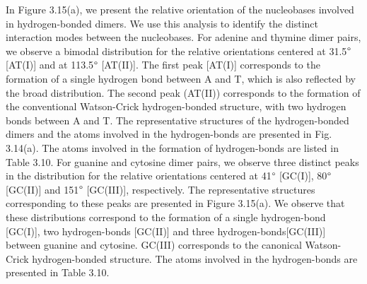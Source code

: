     In Figure 3.15(a), we present the relative orientation of the nucleobases involved in hydrogen-bonded dimers. We use this analysis to identify the distinct interaction modes between the nucleobases. For adenine and thymine dimer pairs, we observe a bimodal distribution for the relative orientations centered at 31.5$\degree$ [AT(I)] and at 113.5$\degree$ [AT(II)]. The first peak [AT(I)] corresponds to the formation of a single hydrogen bond between A and T, which is also reflected by the broad distribution. The second peak (AT(II)) corresponds to the formation of the conventional Watson-Crick hydrogen-bonded structure, with two hydrogen bonds between A and T. The representative structures of the hydrogen-bonded dimers and the atoms involved in the hydrogen-bonds are presented in Fig. 3.14(a). The atoms involved in the formation of hydrogen-bonds are listed in Table 3.10. For guanine and cytosine dimer pairs, we observe three distinct peaks in the distribution for the relative orientations centered at 41$\degree$ [GC(I)], 80$\degree$ [GC(II)] and 151$\degree$ [GC(III)], respectively. The representative structures corresponding to these peaks are presented in Figure 3.15(a). We observe that these distributions correspond to the formation of a single hydrogen-bond [GC(I)], two hydrogen-bonds [GC(II)] and three hydrogen-bonds[GC(III)] between guanine and cytosine. GC(III) corresponds to the canonical Watson-Crick hydrogen-bonded structure. The atoms involved in the hydrogen-bonds are presented in Table 3.10.

